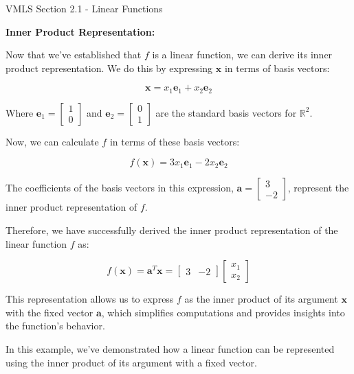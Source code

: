 \begin{notes}{VMLS Section 2.1 - Linear Functions}
\begin{highlight}
        \vspace*{1em} \textbf{Inner Product Representation:} \vspace*{1em}
        
        Now that we've established that \(f\) is a linear function, we can derive its inner product representation. We do this by expressing \(\mathbf{x}\) in terms of basis vectors:
        
        \[
        \mathbf{x} = x_1\mathbf{e}_1 + x_2\mathbf{e}_2
        \]
        
        Where \(\mathbf{e}_1 = \begin{bmatrix} 1 \\ 0 \end{bmatrix}\) and \(\mathbf{e}_2 = \begin{bmatrix} 0 \\ 1 \end{bmatrix}\) are the standard basis vectors for \(\mathbb{R}^2\).
        
        Now, we can calculate \(f\) in terms of these basis vectors:
        
        \[
        f(\mathbf{x}) = 3x_1\mathbf{e}_1 - 2x_2\mathbf{e}_2
        \]
        
        The coefficients of the basis vectors in this expression, \(\mathbf{a} = \begin{bmatrix} 3 \\ -2 \end{bmatrix}\), represent the inner product representation of \(f\).
        
        Therefore, we have successfully derived the inner product representation of the linear function \(f\) as:
        
        \[
        f(\mathbf{x}) = \mathbf{a}^T \mathbf{x} = \begin{bmatrix} 3 & -2 \end{bmatrix} \begin{bmatrix} x_1 \\ x_2 \end{bmatrix}
        \]

        
        This representation allows us to express \(f\) as the inner product of its argument \(\mathbf{x}\) with the fixed vector \(\mathbf{a}\), which simplifies computations and provides insights into the function's behavior.
        
        In this example, we've demonstrated how a linear function can be represented using the inner product of its argument with a fixed vector.
    \end{highlight}
    

\end{notes}
